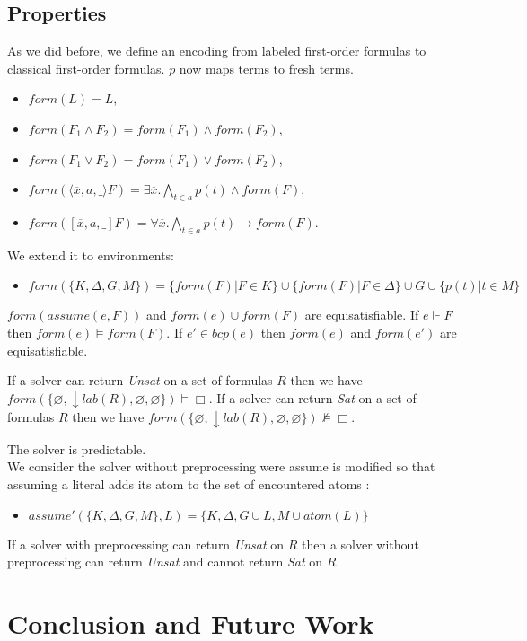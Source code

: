 \documentclass[a4paper,11pt]{article}
\newcommand{\atom}{\mathit{atom}}
\newcommand{\F}{\mathit{form}}
\newcommand{\T}{\mathit{lab}}
\newcommand{\A}{\mathit{assume}}
\newcommand{\B}{\mathit{bcp}}
\begin{document}
\subsection{Properties}
As we did before, we define an encoding from labeled first-order formulas to classical
first-order formulas. $p$ now maps terms to fresh terms.
\begin{itemize}
 \item $\F(L)=L$,
 \item $\F(F_1\wedge F_2)=\F(F_1)\wedge\F(F_2)$,
 \item $\F(F_1\vee F_2)=\F(F_1)\vee\F(F_2)$,
 \item $\F(\langle\overline x,a,\_\rangle F)=\exists\overline x.\bigwedge_{t\in a} p(t)\wedge\F(F)$,
 \item $\F([\overline x,a,\_]F)=\forall \overline x.\bigwedge_{t\in a} p(t)\rightarrow\F(F)$.
\end{itemize}
We extend it to environments:
\begin{itemize}
 \item $\F(\{K,\Delta,G,M\})=\{\F(F)|F\in K\}\cup\{\F(F)|F\in\Delta\}\cup G\cup\{p(t)|t\in M\}$
\end{itemize}
{\lemma $\F(\A(e,F))$ and $\F(e)\cup\F(F)$ are equisatisfiable.}
{\lemma If $e\Vdash F$ then $\F(e)\vDash\F(F)$.}
{\lemma If $e'\in\B(e)$ then $\F(e)$ and $\F(e')$ are equisatisfiable.}

{\theorem If a solver can return \emph{Unsat} on a set of formulas $R$ then we have
$\F(\{\varnothing,\downarrow\T(R),\varnothing,\varnothing\})\vDash\Box$.}
{\theorem If a solver can return \emph{Sat} on a set of formulas $R$ then we have
$\F(\{\varnothing,\downarrow\T(R),\varnothing,\varnothing\})\nvDash\Box$.}

{\corollary The solver is predictable.}\\
We consider the solver without preprocessing were assume is modified so that
assuming a literal adds its atom to the set of encountered atoms :
\begin{itemize}
 \item $\A'(\{K,\Delta,G,M\},L) = \{K,\Delta,G\cup L, M\cup\atom(L)\}$
\end{itemize}

{\theorem If a solver with preprocessing can return \emph{Unsat} on $R$ then
a solver without preprocessing can return \emph{Unsat} and cannot return \emph{Sat} on $R$.}
\section{Conclusion and Future Work}
\end{document}
